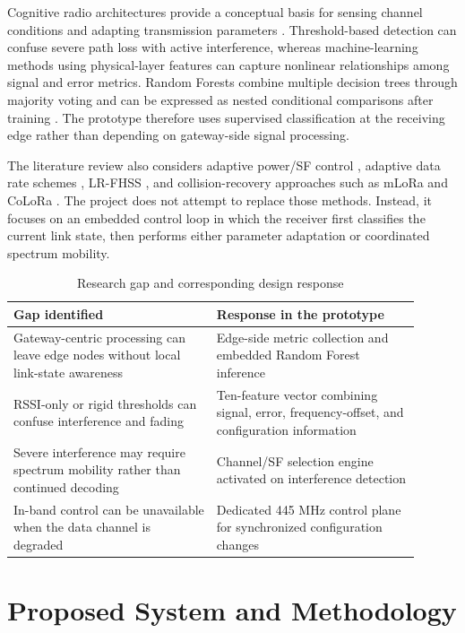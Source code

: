 \documentclass[10pt,a4paper]{article}
\begin{document}
Cognitive radio architectures provide a conceptual basis for sensing channel conditions and adapting transmission parameters \cite{jha,haykin}. Threshold-based detection can confuse severe path loss with active interference, whereas machine-learning methods using physical-layer features can capture nonlinear relationships among signal and error metrics. Random Forests combine multiple decision trees through majority voting and can be expressed as nested conditional comparisons after training \cite{breiman_cart,breiman_rf}. The prototype therefore uses supervised classification at the receiving edge rather than depending on gateway-side signal processing.

The literature review also considers adaptive power/SF control \cite{reynders}, adaptive data rate schemes \cite{abdelfadeel}, LR-FHSS \cite{bukhari}, and collision-recovery approaches such as mLoRa and CoLoRa \cite{wang,tong}. The project does not attempt to replace those methods. Instead, it focuses on an embedded control loop in which the receiver first classifies the current link state, then performs either parameter adaptation or coordinated spectrum mobility.

\begin{table}[htbp]
\centering
\caption{Research gap and corresponding design response}
\label{tab:gap}
\fontsize{8}{9.2}\selectfont
\begin{tabular}{p{0.45\linewidth} p{0.45\linewidth}}
\toprule
\textbf{Gap identified} & \textbf{Response in the prototype} \\
\midrule
Gateway-centric processing can leave edge nodes without local link-state awareness & Edge-side metric collection and embedded Random Forest inference \\
RSSI-only or rigid thresholds can confuse interference and fading & Ten-feature vector combining signal, error, frequency-offset, and configuration information \\
Severe interference may require spectrum mobility rather than continued decoding & Channel/SF selection engine activated on interference detection \\
In-band control can be unavailable when the data channel is degraded & Dedicated 445 MHz control plane for synchronized configuration changes \\
\bottomrule
\end{tabular}
\end{table}

\section{Proposed System and Methodology}
\end{document}
